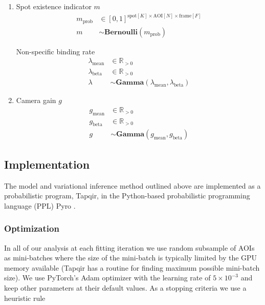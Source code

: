 \begin{enumerate}
\item Spot existence indicator $m$
\begin{subequations}
\begin{align}
    m_\mathrm{prob} &\in [ 0, 1 ]^{\mathrm{spot}[K] \times \mathrm{AOI}[N] \times \mathrm{frame}[F]} \\
    m &\sim \mathbf{Bernoulli}(m_\mathrm{prob})
\end{align}
\end{subequations}

Non-specific binding rate
\begin{subequations}
\begin{align}
    \lambda_\mathrm{mean} &\in \mathbb{R}_{>0} \\
    \lambda_\mathrm{beta} &\in \mathbb{R}_{>0} \\
    \lambda &\sim \mathbf{Gamma}(\lambda_\mathrm{mean}, \lambda_\mathrm{beta})
\end{align}
\end{subequations}

\item Camera gain $g$
\begin{subequations}
\begin{align}
    g_\mathrm{mean} &\in \mathbb{R}_{>0} \\
    g_\mathrm{beta} &\in \mathbb{R}_{>0} \\
    g &\sim \mathbf{Gamma}(g_\mathrm{mean}, g_\mathrm{beta})
\end{align}
\end{subequations}
\end{enumerate}

\subsection*{Implementation}

The model and variational inference method outlined above are implemented as a probabilistic program, Tapqir, in the Python-based probabilistic programming language (PPL) Pyro \cite{Foerster2018-kd,Bingham2019-qy,Obermeyer2019-xt}.

\subsubsection*{Optimization}

In all of our analysis at each fitting iteration we use random subsample of AOIs as mini-batches where the size of the mini-batch is typically limited by the GPU memory available (Tapqir has a routine for finding maximum possible mini-batch size). We use PyTorch's Adam optimizer with the learning rate of $5\times 10^{-3}$ and keep other parameters at their default values. As a stopping criteria we use a heuristic rule

